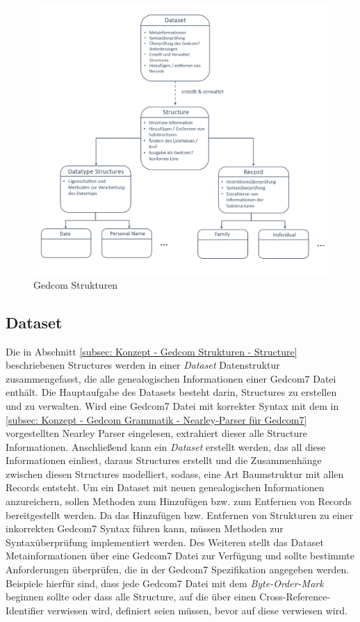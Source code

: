 \begin{figure}[h]
	\centering
	\includegraphics[width=1.0\textwidth]{images/konzept_structure.png}
	\caption{Gedcom Strukturen}
	\label{fig: Gedcom Strukturen}
\end{figure}

\subsection{Dataset}
\label{subsec: Konzept - Gedcom Strukturen - Dataset}
Die in Abschnitt \ref{subsec: Konzept - Gedcom Strukturen - Structure} beschriebenen Structures werden in einer \textit{Dataset} Datenstruktur zusammengefasst, die alle genealogischen Informationen einer Gedcom7 Datei enthält. Die Hauptaufgabe des Datasets besteht darin, Structures zu erstellen und zu verwalten. Wird eine Gedcom7 Datei mit korrekter Syntax mit dem in \ref{subsec: Konzept - Gedcom Grammatik - Nearley-Parser für Gedcom7} vorgestellten Nearley Parser eingelesen, extrahiert dieser alle Structure Informationen. Anschließend kann ein \textit{Dataset} erstellt werden, das all diese Informationen einliest, daraus Structures erstellt und die Zusammenhänge zwischen diesen Structures modelliert, sodass, eine Art Baumstruktur mit allen Records entsteht. Um ein Dataset mit neuen genealogischen Informationen anzureichern, sollen Methoden zum Hinzufügen bzw. zum Entfernen von Records bereitgestellt werden. Da das Hinzufügen bzw. Entfernen von Strukturen zu einer inkorrekten Gedcom7 Syntax führen kann, müssen Methoden zur Syntaxüberprüfung implementiert werden. Des Weiteren stellt das Dataset Metainformationen über eine Gedcom7 Datei zur Verfügung und sollte bestimmte Anforderungen überprüfen, die in der Gedcom7 Spezifikation angegeben werden. Beispiele hierfür sind, dass jede Gedcom7 Datei mit dem \textit{Byte-Order-Mark} beginnen sollte oder dass alle Structure, auf die über einen Cross-Reference-Identifier verwiesen wird, definiert seien müssen, bevor auf diese verwiesen wird. 

